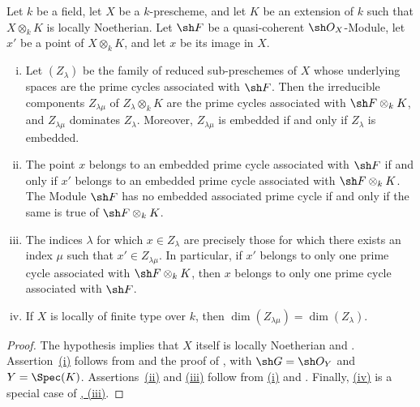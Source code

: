 \begin{proposition}[4.2.7]
\label{IV.4.2.7}
Let $k$ be a field, let $X$ be a $k$-prescheme, and let $K$ be an
extension of $k$ such that $X\otimes_k K$ is locally Noetherian.
Let $\sh F$ be a quasi-coherent $\sh O_X$-Module, let $x'$ be a point
of $X\otimes_k K$, and let $x$ be its image in $X$.
\begin{enumerate}[(i)]
\item[\textup{(i)}]
\label{IV.4.2.7.i}
Let $(Z_\lambda)$ be the family of reduced sub-preschemes of $X$ whose
underlying spaces are the prime cycles associated with $\sh F$.
Then the irreducible components $Z_{\lambda\mu}$ of
$Z_\lambda\otimes_k K$ are the prime cycles associated with
$\sh F\otimes_k K$, and $Z_{\lambda\mu}$ dominates $Z_\lambda$.
Moreover, $Z_{\lambda\mu}$ is embedded if and only if $Z_\lambda$ is
embedded.

\item[\textup{(ii)}]
\label{IV.4.2.7.ii}
The point $x$ belongs to an embedded prime cycle associated with
$\sh F$ if and only if $x'$ belongs to an embedded prime cycle
associated with $\sh F\otimes_k K$.
The Module $\sh F$ has no embedded associated prime cycle if and only if
the same is true of $\sh F\otimes_k K$.


\item[\textup{(iii)}]
\label{IV.4.2.7.iii}
The indices $\lambda$ for which $x\in Z_\lambda$ are precisely those for
which there exists an index $\mu$ such that
$x'\in Z_{\lambda\mu}$.
In particular, if $x'$ belongs to only one prime cycle associated with
$\sh F\otimes_k K$, then $x$ belongs to only one prime cycle associated
with $\sh F$.

\item[\textup{(iv)}]
\label{IV.4.2.7.iv}
If $X$ is locally of finite type over $k$, then $\dim(Z_{\lambda\mu})=\dim(Z_\lambda)$.
\end{enumerate}
\end{proposition}

\begin{proof}
The hypothesis implies that $X$ itself is locally Noetherian
 and .
Assertion~{\hyperref[IV.4.2.7.i]{(i)}} follows from
 and the proof of , with
$\sh G=\sh O_Y$ and $Y=\Spec(K)$.
Assertions~{\hyperref[IV.4.2.7.ii]{(ii)}} and
{\hyperref[IV.4.2.7.iii]{(iii)}} follow from
{\hyperref[IV.4.2.7.i]{(i)}} and .
Finally, {\hyperref[IV.4.2.7.iv]{(iv)}} is a special case of
{\hyperref[IV.4.2.4.iii]{, (iii)}}.
\end{proof}

